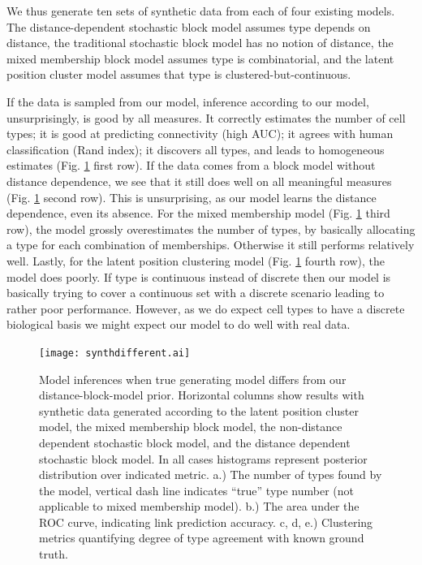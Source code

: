 \documentclass{article}
\begin{document}
We thus generate ten sets of synthetic data from each of four existing
models.  The distance-dependent stochastic block model assumes type
depends on distance, the traditional stochastic block model has no
notion of distance, the mixed membership block model assumes type is
combinatorial, and the latent position cluster model assumes that type
is clustered-but-continuous.

If the data is sampled from our model, inference according to our
model, unsurprisingly, is good by all measures. It correctly estimates
the number of cell types; it is good at predicting connectivity (high
AUC); it agrees with human classification (Rand index); it discovers
all types, and leads to homogeneous estimates
(Fig. \ref{fig:othermodel} first row). If the data comes from a block
model without distance dependence, we see that it still does well on
all meaningful measures (Fig. \ref{fig:othermodel} second row). This
is unsurprising, as our model learns the distance dependence, even its
absence. For the mixed membership model (Fig. \ref{fig:othermodel}
third row), the model grossly overestimates the number of types, by
basically allocating a type for each combination of
memberships. Otherwise it still performs relatively well. Lastly, for
the latent position clustering model (Fig. \ref{fig:othermodel} fourth
row), the model does poorly. If type is continuous instead of discrete
then our model is basically trying to cover a continuous set with a
discrete scenario leading to rather poor performance. However, as we
do expect cell types to have a discrete biological basis we might
expect our model to do well with real data.


\begin{figure}
  \centering 

  \texttt{[image: synthdifferent.ai]}
  \caption{Model inferences when true generating model differs from
    our distance-block-model prior. Horizontal columns show results
    with synthetic data generated according to the latent position
    cluster model, the mixed membership block model, the non-distance
    dependent stochastic block model, and the distance dependent
    stochastic block model. In all cases histograms represent
    posterior distribution over indicated metric. a.) The number of
    types found by the model, vertical dash line indicates ``true''
    type number (not applicable to mixed membership model). b.) The
    area under the ROC curve, indicating link prediction accuracy. c,
    d, e.) Clustering metrics quantifying degree of type agreement
    with known ground truth. }

  \label{fig:othermodel}
\end{figure}
\end{document}
